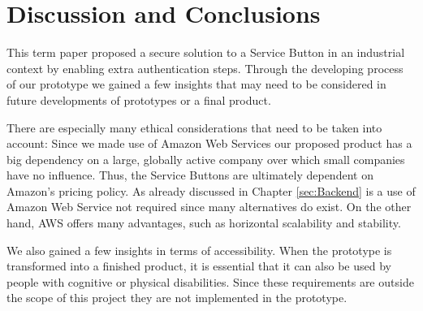 
\section{Discussion and Conclusions}
\label{sec:Future}


This term paper proposed a secure solution to a Service Button in an industrial context by enabling extra authentication steps. Through the developing process of our prototype we gained a few insights that may need to be considered in future developments of prototypes or a final product.

There are especially many ethical considerations that need to be taken into account: Since we made use of Amazon Web Services our proposed product has a big dependency on a large, globally active company over which small companies have no influence. Thus, the Service Buttons are ultimately dependent on Amazon's pricing policy. As already discussed in Chapter \ref{sec:Backend} is a use of Amazon Web Service not required since many alternatives do exist. On the other hand, AWS offers many advantages, such as horizontal scalability and stability.

We also gained a few insights in terms of accessibility. When the prototype is transformed into a finished product, it is essential that it can also be used by people with cognitive or physical disabilities. Since these requirements are outside the scope of this project they are not implemented in the prototype.



